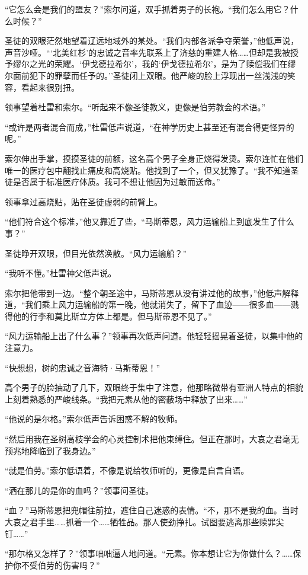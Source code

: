 \documentclass[AutoFakeBold=true]{book}
\begin{document}
``它怎么会是我们的盟友？''索尔问道，双手抓着男子的长袍。``我们怎么用它？什么时候？''

圣徒的双眼茫然地望着辽远地域外的某处。``我们内部各派争夺荣誉，''他低声说，声音沙哑。```北美红杉'的忠诚之音率先联系上了济慈的重建人格……但却是我被授予缪尔之光的荣耀。`伊戈德拉希尔'，我的`伊戈德拉希尔'，是为了赎偿我们在缪尔面前犯下的罪孽而任予的。''圣徒闭上双眼。他严峻的脸上浮现出一丝浅浅的笑容，看起来很别扭。

领事望着杜雷和索尔。``听起来不像圣徒教义，更像是伯劳教会的术语。''

``或许是两者混合而成，''杜雷低声说道，``在神学历史上甚至还有混合得更怪异的呢。''

索尔伸出手掌，摸摸圣徒的前额，这名高个男子全身正烧得发烫。索尔连忙在他们唯一的医疗包中翻找止痛皮和高烧贴。他找到了一个，但又犹豫了。``我不知道圣徒是否属于标准医疗体质。我可不想让他因为过敏而送命。''

领事拿过高烧贴，贴在圣徒虚弱的前臂上。

``他们符合这个标准，''他又靠近了些，``马斯蒂恩，风力运输船上到底发生了什么事？''

圣徒睁开双眼，但目光依然涣散。``风力运输船？''

``我听不懂。''杜雷神父低声说。

索尔把他带到一边。``整个朝圣途中，马斯蒂恩从没有讲过他的故事，''他低声解释道，``我们乘上风力运输船的第一晚，他就消失了，留下了血迹——很多血——溅得他的行李和莫比斯立方体上都是。但马斯蒂恩不见了。''

``风力运输船上出了什么事？''领事再次低声问道。他轻轻摇晃着圣徒，以集中他的注意力。

``快想想，树的忠诚之音海特·马斯蒂恩！''

高个男子的脸抽动了几下，双眼终于集中了注意，他那略微带有亚洲人特点的相貌上刻着熟悉的严峻线条。``我把元素从他的密蔽场中释放了出来……''

``他说的是尔格。''索尔低声告诉困惑不解的牧师。

``然后用我在圣树高枝学会的心灵控制术把他束缚住。但正在那时，大哀之君毫无预兆地降临到了我身边。''

``就是伯劳。''索尔低语着，不像是说给牧师听的，更像是自言自语。

``洒在那儿的是你的血吗？''领事问圣徒。

``血？''马斯蒂恩把兜帽往前拉，遮住自己迷惑的表情。``不，那不是我的血。当时大哀之君手里……抓着一个……牺牲品。那人使劲挣扎。试图要逃离那些赎罪尖钉……''

``那尔格又怎样了？''领事咄咄逼人地问道。``元素。你本想让它为你做什么？……保护你不受伯劳的伤害吗？''
\end{document}
